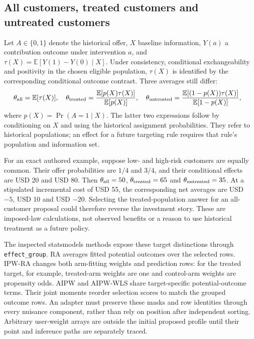 \subsection{All customers, treated customers and untreated customers}
\label{exec20:pyfx-population}
Let $A\in\{0,1\}$ denote the historical offer, $X$ baseline information,
$Y(a)$ a contribution outcome under intervention $a$, and
$\tau(X)=\mathbb E[Y(1)-Y(0)\mid X]$. Under consistency, conditional
exchangeability and positivity in the chosen eligible population,
$\tau(X)$ is identified by the corresponding conditional outcome contrast.
Three averages still differ:
\begin{equation}
 \theta_{\rm all}=\mathbb E[\tau(X)],\quad
 \theta_{\rm treated}=\frac{\mathbb E[p(X)\tau(X)]}{\mathbb E[p(X)]},\quad
 \theta_{\rm untreated}=\frac{\mathbb E[(1-p(X))\tau(X)]}{\mathbb E[1-p(X)]},
 \label{exec20:pyfx-targets}
\end{equation}
where $p(X)=\Pr(A=1\mid X)$. The latter two expressions follow by conditioning
on $X$ and using the historical assignment probabilities. They refer to
historical populations; an effect for a future targeting rule requires that
rule's population and information set.

For an exact authored example, suppose low- and high-risk customers are
equally common. Their offer probabilities are $1/4$ and $3/4$, and their
conditional effects are USD 20 and USD 80. Then
$\theta_{\rm all}=50$, $\theta_{\rm treated}=65$ and
$\theta_{\rm untreated}=35$. At a stipulated incremental cost of USD 55,
the corresponding net averages are USD $-5$, USD 10 and USD $-20$.
Selecting the treated-population answer for an all-customer proposal could
therefore reverse the investment story. These are imposed-law calculations,
not observed benefits or a reason to use historical treatment as a future
policy.\citep{exec20_python_effect_reference}

The inspected statsmodels methods expose these target distinctions through
\texttt{effect\_group}. RA averages fitted potential outcomes over the
selected rows. IPW-RA changes both arm-fitting weights and prediction rows:
for the treated target, for example, treated-arm weights are one and
control-arm weights are propensity odds. AIPW and AIPW-WLS share
target-specific potential-outcome terms. Their joint moments reorder
selection scores to match the grouped outcome rows. An adapter must preserve
these masks and row identities through every nuisance component, rather
than rely on position after independent sorting. Arbitrary user-weight
arrays are outside the initial proposed profile until their point and
inference paths are separately traced.\citep{exec20_python_effect_source}

